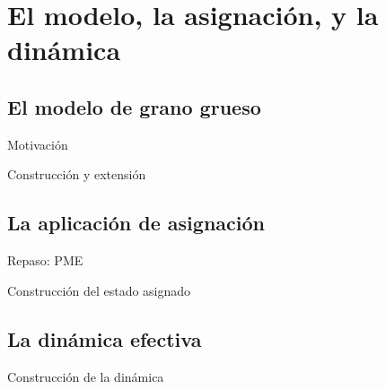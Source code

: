 \section{El modelo, la asignación, y la dinámica}

\subsection{El modelo de grano grueso}
\begin{frame}{Motivación}
    \lipsum[1]
\end{frame}

\begin{frame}{Construcción y extensión}
    \lipsum[1]
\end{frame}

\subsection{La aplicación de asignación}
\begin{frame}{Repaso: PME}
    \lipsum[1]
\end{frame}

\begin{frame}{Construcción del estado asignado}
    \lipsum[1]
\end{frame}


\subsection{La dinámica efectiva}
\begin{frame}{Construcción de la dinámica}
    \lipsum[1]
\end{frame}
